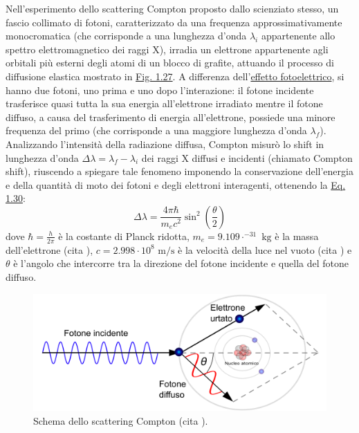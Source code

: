 \documentclass[12pt,a4paper,twoside]{report}
\begin{document}
	Nell'esperimento dello scattering Compton proposto dallo scienziato stesso, un fascio collimato di fotoni, caratterizzato da una frequenza approssimativamente monocromatica (che corrisponde a una lunghezza d'onda $\lambda_i$ appartenente allo spettro elettromagnetico dei raggi X), irradia un elettrone appartenente agli orbitali più esterni degli atomi di un blocco di grafite, attuando il processo di diffusione elastica mostrato in \hyperref[fig:compton]{Fig. 1.27}. A differenza dell'\hyperref[par:effetto_fotoelettrico]{effetto fotoelettrico}, si hanno due fotoni, uno prima e uno dopo l'interazione: il fotone incidente trasferisce quasi tutta la sua energia all'elettrone irradiato mentre il fotone diffuso, a causa del trasferimento di energia all'elettrone, possiede una minore frequenza del primo (che corrisponde a una maggiore lunghezza d'onda $\lambda_f$). Analizzando l'intensità della radiazione diffusa, Compton misurò lo shift in lunghezza d'onda $\Delta \lambda=\lambda_f-\lambda_i$ dei raggi X diffusi e incidenti (chiamato Compton shift), riuscendo a spiegare tale fenomeno imponendo la conservazione dell'energia e della quantità di moto dei fotoni e degli elettroni interagenti, ottenendo la \hyperref[eq:compton]{Eq. 1.30}:
	\begin{equation}
		\Delta \lambda=\frac{4\pi\hbar}{m_ec^2}\sin^2{\left(\frac{\theta}{2}\right)}
		\label{eq:compton}
	\end{equation}
	dove $\hbar=\frac{h}{2\pi}$ è la costante di Planck ridotta, $m_e=9.109\cdot^{-31}\mbox{ kg}$ è la massa dell'elettrone (cita
	), $c=2.998\cdot10^{8}\mbox{ m/s}$ è la velocità della luce nel vuoto (cita
	) e $\theta$ è l'angolo che intercorre tra la direzione del fotone incidente e quella del fotone diffuso.
	\begin{figure}[H]
		\centering
		\includegraphics[width=0.9\linewidth]{compton.pdf}
		\caption{Schema dello scattering Compton (cita
			).}
		\label{fig:compton}
	\end{figure}
\end{document}
